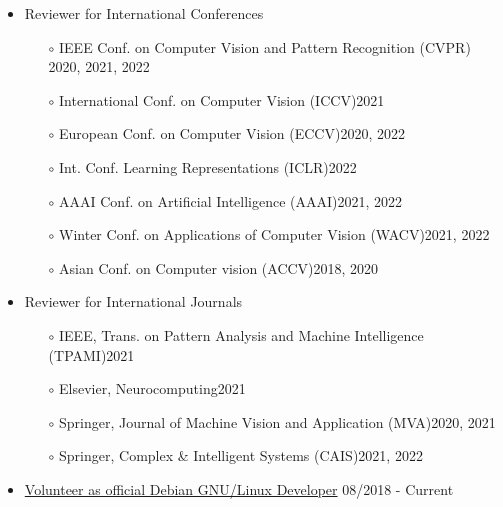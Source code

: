 \documentclass[10pt,margin,line,pifont,palatino,courier]{res}
\begin{document}
\begin{resume}
\begin{itemize}[leftmargin=*]
\item Reviewer for International Conferences
	\begin{itemize}[noitemsep, leftmargin=*]
		\item[$\circ$] IEEE Conf. on Computer Vision and Pattern Recognition (CVPR) \hfill 2020, 2021, 2022
		\item[$\circ$] International Conf. on Computer Vision (ICCV)\hfill 2021
		\item[$\circ$] European Conf. on Computer Vision (ECCV)\hfill 2020, 2022
		\item[$\circ$] Int. Conf. Learning Representations (ICLR)\hfill 2022
		\item[$\circ$] AAAI Conf. on Artificial Intelligence (AAAI)\hfill 2021, 2022
		\item[$\circ$] Winter Conf. on Applications of Computer Vision (WACV)\hfill 2021, 2022
		\item[$\circ$] Asian Conf. on Computer vision (ACCV)\hfill 2018, 2020
	\end{itemize}
\item Reviewer for International Journals
	\begin{itemize}[noitemsep, leftmargin=*]
		\item[$\circ$] IEEE, Trans. on Pattern Analysis and Machine Intelligence (TPAMI)\hfill 2021
		\item[$\circ$] Elsevier, Neurocomputing\hfill 2021
		\item[$\circ$] Springer, Journal of Machine Vision and Application (MVA)\hfill 2020, 2021
		\item[$\circ$] Springer, Complex \& Intelligent Systems (CAIS)\hfill 2021, 2022
	\end{itemize}
\item \href{https://nm.debian.org/person/lumin/}{Volunteer as official Debian GNU/Linux Developer}
	\hfill 08/2018 - Current\\
\end{itemize}

%
%
%


\end{resume}
\end{document}
